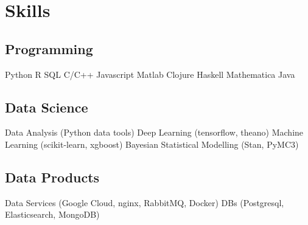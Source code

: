 \documentclass[]{deedy-resume-openfont}
\begin{document}
\begin{minipage}[t]{0.33\textwidth}



\sectionsep
\section{Skills}

\subsection{Programming}
    Python \textbullet{}
    R \textbullet{}
    SQL \textbullet{}
    C/C++ \textbullet{}
    Javascript \textbullet{}
    Matlab \textbullet{}
    Clojure \textbullet{}
    Haskell \textbullet{}
    Mathematica \textbullet{}
    Java

\sectionsep
\subsection{Data Science}
Data Analysis (Python data tools) \textbullet{}
Deep Learning (tensorflow, theano) \textbullet{}
Machine Learning (scikit-learn, xgboost) \textbullet{}
Bayesian Statistical Modelling (Stan, PyMC3)
   
\sectionsep
\subsection{Data Products}
Data Services (Google Cloud, nginx, RabbitMQ, Docker) \textbullet{}
DBs (Postgresql, Elasticsearch, MongoDB)


%
%

\end{minipage} 
\hfill
\end{document}
